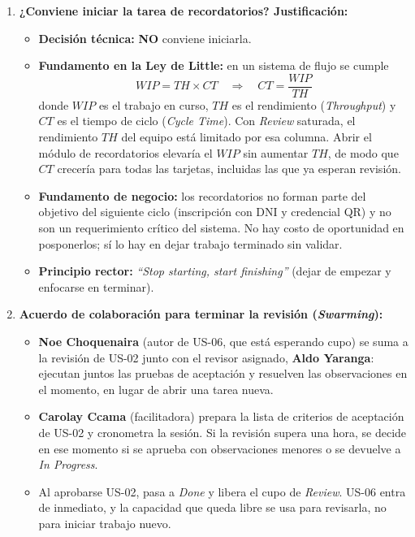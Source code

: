 \documentclass[11pt,a4paper]{article}
\begin{document}
\begin{enumerate}
    \item \textbf{¿Conviene iniciar la tarea de recordatorios? Justificación:}
    \begin{itemize}
        \item \textbf{Decisión técnica:} \textbf{NO} conviene iniciarla.
        \item \textbf{Fundamento en la Ley de Little:} en un sistema de flujo se cumple
        \begin{equation}
            WIP = TH \times CT \quad \Longrightarrow \quad CT = \frac{WIP}{TH}
        \end{equation}
        donde $WIP$ es el trabajo en curso, $TH$ es el rendimiento (\textit{Throughput}) y $CT$ es el tiempo de ciclo (\textit{Cycle Time}). Con \textit{Review} saturada, el rendimiento $TH$ del equipo está limitado por esa columna. Abrir el módulo de recordatorios elevaría el $WIP$ sin aumentar $TH$, de modo que $CT$ crecería para todas las tarjetas, incluidas las que ya esperan revisión.
        \item \textbf{Fundamento de negocio:} los recordatorios no forman parte del objetivo del siguiente ciclo (inscripción con DNI y credencial QR) y no son un requerimiento crítico del sistema. No hay costo de oportunidad en posponerlos; sí lo hay en dejar trabajo terminado sin validar.
        \item \textbf{Principio rector:} \textit{``Stop starting, start finishing''} (dejar de empezar y enfocarse en terminar).
    \end{itemize}

    \item \textbf{Acuerdo de colaboración para terminar la revisión (\textit{Swarming}):}
    \begin{itemize}
        \item \textbf{Noe Choquenaira} (autor de US-06, que está esperando cupo) se suma a la revisión de US-02 junto con el revisor asignado, \textbf{Aldo Yaranga}: ejecutan juntos las pruebas de aceptación y resuelven las observaciones en el momento, en lugar de abrir una tarea nueva.
        \item \textbf{Carolay Ccama} (facilitadora) prepara la lista de criterios de aceptación de US-02 y cronometra la sesión. Si la revisión supera una hora, se decide en ese momento si se aprueba con observaciones menores o se devuelve a \textit{In Progress}.
        \item Al aprobarse US-02, pasa a \textit{Done} y libera el cupo de \textit{Review}. US-06 entra de inmediato, y la capacidad que queda libre se usa para revisarla, no para iniciar trabajo nuevo.
    \end{itemize}


\end{enumerate}
\end{document}
